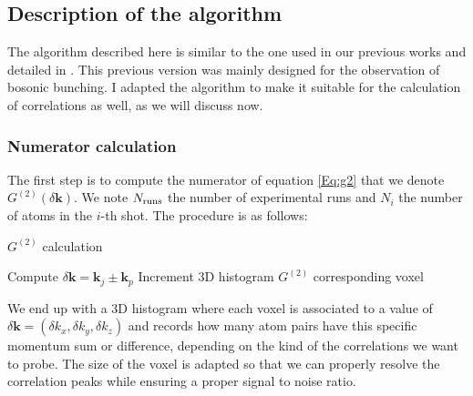 \subsection{Description of the algorithm}

The algorithm described here is similar to the one used in our previous works \cite{carcy2019momentum,cayla2020} and detailed in \cite{carcy_these,cayla_these}. This previous version was mainly designed for the observation of bosonic bunching. I adapted the algorithm to make it suitable for the calculation of \kmk correlations as well, as we will discuss now.

\subsubsection{Numerator calculation}

The first step is to compute the numerator of equation \ref{Eq:g2} that we denote $G^{(2)}(\delta \bm{k})$. We note $N_{\rm{runs}}$ the number of experimental runs and $N_{i}$ the number of atoms in the $i$-th shot. The procedure is as follows:


\newpage

\begin{algorithm}[h!]
 \caption{$G^{(2)}$ calculation}
    \begin{algorithmic}
                    \State Compute $\delta \bm{k} = \bm{k}_j \pm \bm{k}_p$
                    \State Increment 3D histogram $G^{(2)}$ corresponding voxel
                \EndFor
            \EndFor
        \EndFor
\end{algorithmic}

\end{algorithm}

\noindent We end up with a 3D histogram where each voxel is associated to a value of $\delta \bm{k} = (\delta k_x,\delta k_y, \delta k_z)$ and records how many atom pairs have this specific momentum sum or difference, depending on the kind of the correlations we want to probe. The size of the voxel is adapted so that we can properly resolve the correlation peaks while ensuring a proper signal to noise ratio.

